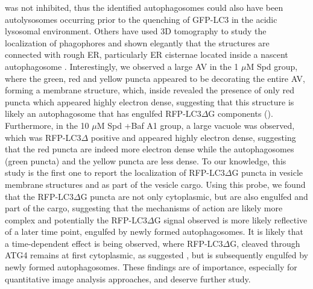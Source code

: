 was not inhibited, thus the identified autophagosomes could also have been autolysosomes occurring prior to the quenching of GFP-LC3 in the acidic lysosomal environment. Others have used 3D tomography to study the localization of phagophores and shown elegantly that the structures are connected with rough ER, particularly ER cisternae located inside a nascent autophagosome \citep{Yla-Anttila2009}. Interestingly, we observed a large AV in the 1 $\mu$M Spd group, where the green, red and yellow puncta appeared to be decorating the entire AV, forming a membrane structure, which, inside revealed the presence of only red puncta which appeared highly electron dense, suggesting that this structure is likely an autophagosome that has engulfed RFP-LC3$\Delta$G components (). Furthermore, in the 10 $\mu$M Spd +Baf A1 group, a large vacuole was observed, which was RFP-LC3$\Delta$ positive and appeared highly electron dense, suggesting that the red puncta are indeed more electron dense while the autophagosomes (green puncta) and the yellow puncta are less dense. To our knowledge, this study is the first one to report the localization of RFP-LC3$\Delta$G puncta in vesicle membrane structures and as part of the vesicle cargo. Using this probe, we found that the RFP-LC3$\Delta$G puncta are not only cytoplasmic, but are also engulfed and part of the cargo, suggesting that the mechanisms of action are likely more complex and potentially the RFP-LC3$\Delta$G signal observed is more likely reflective of a later time point, engulfed by newly formed autophagosomes. It is likely that a time-dependent effect is being observed, where RFP-LC3$\Delta$G, cleaved through ATG4 remains at first cytoplasmic, as suggested \citep{Kaizuka2016}, but is subsequently engulfed by newly formed autophagosomes. These findings are of importance, especially for quantitative image analysis approaches, and deserve further study.

